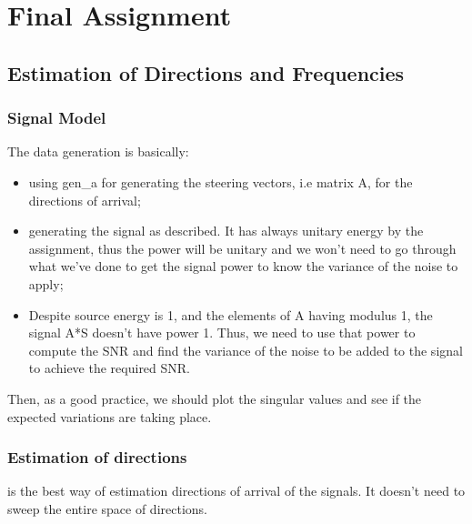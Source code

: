 \documentclass[12pt, a4paper]{article}
\begin{document}
\section{Final Assignment}

\subsection{Estimation of Directions and Frequencies}

\subsubsection{Signal Model}
The data generation is basically:
\begin{itemize}
    \item using gen\_a for generating the steering vectors, i.e matrix A, for the directions of arrival;
    \item generating the signal as described. It has always unitary energy by the assignment, thus the power will be unitary and we won't need to go through what we've done to get the signal power to know the variance of the noise to apply;
    \item Despite source energy is 1, and the elements of A having modulus 1, the signal A*S doesn't have power 1. Thus, we need to use that power to compute the SNR and find the variance of the noise to be added to the signal to achieve the required SNR.
\end{itemize}

\par Then, as a good practice, we should plot the singular values and see if the expected variations are taking place.

\subsubsection{Estimation of directions}
 is the best way of estimation directions of arrival of the signals. It doesn't need to sweep the entire space of directions.
\end{document}
